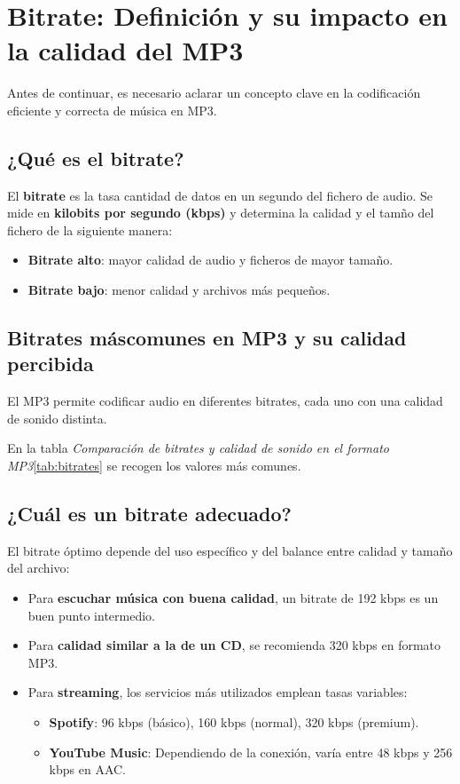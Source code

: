 \section{Bitrate: Definición y su impacto en la calidad del MP3}

Antes de continuar, es necesario aclarar un concepto clave en la codificación eficiente y correcta de música en MP3.

\subsection{¿Qué es el bitrate?}
El \textbf{bitrate} es la tasa cantidad de datos en un segundo del fichero de audio. Se mide en \textbf{kilobits por segundo (kbps)} y determina la calidad y el tamño del fichero de la siguiente manera:
\begin{itemize}
    \item \textbf{Bitrate alto}: mayor calidad de audio y ficheros de mayor tamaño.
    \item \textbf{Bitrate bajo}: menor calidad y archivos más pequeños.
\end{itemize}

\subsection{Bitrates máscomunes en MP3 y su calidad percibida}
El MP3 permite codificar audio en diferentes bitrates, cada uno con una calidad de sonido distinta.



En la tabla \emph{Comparación de bitrates y calidad de sonido en el formato MP3}\ref{tab:bitrates} se recogen los valores más comunes.

\subsection{¿Cuál es un bitrate adecuado?}
El bitrate óptimo depende del uso específico y del balance entre calidad y tamaño del archivo:

\begin{itemize}
    \item Para \textbf{escuchar música con buena calidad}, un bitrate de 192 kbps es un buen punto intermedio.
    \item Para \textbf{calidad similar a la de un CD}, se recomienda 320 kbps en formato MP3.
    \item Para \textbf{streaming}, los servicios más utilizados emplean tasas variables:
    \begin{itemize}
        \item \textbf{Spotify}: 96 kbps (básico), 160 kbps (normal), 320 kbps (premium).
        \item \textbf{YouTube Music}: Dependiendo de la conexión, varía entre 48 kbps y 256 kbps en AAC.
    \end{itemize}
\end{itemize}

